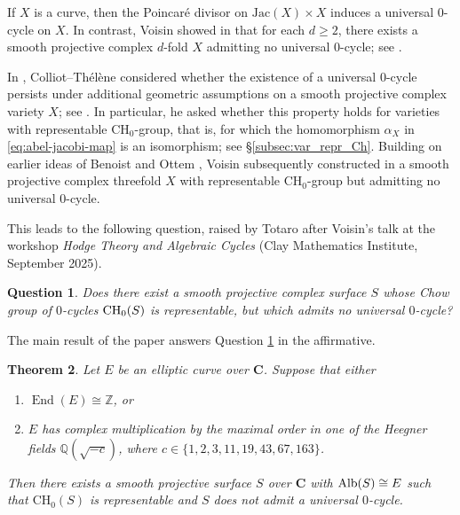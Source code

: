\documentclass[11pt,letterpaper]{amsart}
\newcommand{\Alb}{\textnormal{Alb}}
\newcommand{\Jac}{\text{Jac}}
\newcommand{\CH}{\textnormal{CH}}
\numberwithin{equation}{section}
\newtheorem{theorem}{Theorem}[section]
\newtheorem{ques}[theorem]{Question}
\theoremstyle{definition}
\theoremstyle{remark}
\newcommand{\Q}{\mathbb{Q}}
\newcommand{\Z}{\mathbb{Z}}
\newcommand{\bbC}{\mathbf{C}}
\newcommand{\Ch}{\operatorname{CH_{0}}}
\DeclareMathOperator{\End}{End}
\begin{document}
If $X$ is a curve, then the Poincaré divisor on $\Jac(X)\times X$ induces a universal $0$-cycle on $X$. In contrast, Voisin showed in \cite{Voisin2025} that for each $d\geq2$, there exists a smooth projective complex $d$-fold $X$ admitting no universal $0$-cycle; see \cite[Corollary  0.14]{Voisin2025}.\par
In \cite{colliotthélène2025notessurlapplicationdalbanese}, Colliot--Th\'{e}l\`ene considered whether the existence of a universal $0$-cycle persists under additional geometric assumptions on a smooth projective complex variety $X$; see \cite[Question 3.6]{colliotthélène2025notessurlapplicationdalbanese}. In particular, he asked whether this property holds for varieties with representable $\Ch$-group, that is, for which the homomorphism $\alpha_{X}$ in \eqref{eq:abel-jacobi-map} is an isomorphism; see \S \ref{subsec:var_repr_Ch}. Building on earlier ideas of Benoist and Ottem \cite{benoist-ottem}, Voisin subsequently constructed in \cite{voisin_a} a smooth projective complex threefold $X$ with representable $\Ch$-group but admitting no universal $0$-cycle.\par

This leads to the following question, raised by Totaro after Voisin’s talk at the workshop \emph{Hodge Theory and Algebraic Cycles} (Clay Mathematics Institute, September 2025).

\begin{ques}\label{ques:2-dim_example}
Does there exist a smooth projective complex surface $S$ whose Chow group of $0$-cycles $\CH_0(S)$ is representable, but which admits no universal $0$-cycle?
\end{ques}

The main result of the paper answers Question \ref{ques:2-dim_example} in the affirmative.

\begin{theorem}\label{thm:main_result}
Let $E$ be an elliptic curve over $\bbC$. Suppose that either
\begin{enumerate}[label=\textup{(\roman*)}]
    \item\label{it:trivial_end_C} $\End(E)\cong \Z$, or
    \item\label{it:CM_E_C} $E$ has complex multiplication by the maximal order in one of the Heegner fields $\Q(\sqrt{-c})$, where $c\in\{1,2,3,11,19,43,67,163\}$.
\end{enumerate}
Then there exists a smooth projective surface $S$ over $\bbC$ with $\Alb(S)\cong E$ such that $\Ch(S)$ is representable and $S$ does not admit a universal $0$-cycle.
\end{theorem}
\end{document}
